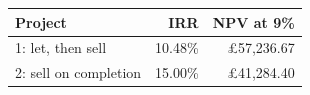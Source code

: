 \begin{tabular}{lrr}\toprule
Project & IRR & NPV at 9\%\\\midrule
1: let, then sell & 10.48\% & £57,236.67\\
2: sell on completion & 15.00\% & £41,284.40\\
\bottomrule\end{tabular}
